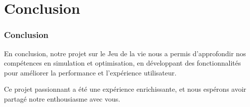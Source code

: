 \documentclass{beamer}
\begin{document}
\section{Conclusion}


\begin{frame}
  \frametitle{Conclusion}
 En conclusion, notre projet sur le Jeu de la vie nous a permis d'approfondir nos compétences en simulation et optimisation, en développant des fonctionnalités pour améliorer la performance et l'expérience utilisateur.\newline
  
 Ce projet passionnant a été une expérience enrichissante, et nous espérons avoir partagé notre enthousiasme avec vous.   

\end{frame}
\end{document}

